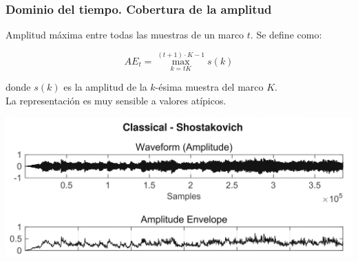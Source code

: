 \documentclass[
10pt, %
aspectratio=169, %
]{beamer}
\begin{document}
	\begin{frame}
		
		\frametitle{Dominio del tiempo. Cobertura de la amplitud}
		
		Amplitud máxima entre todas las muestras de un marco $t$. Se define como:
		
		$${AE}_t = \max_{k=tK}^{(t+1) \cdot K-1} s(k)$$
		
		donde $s(k)$ es la amplitud de la $k$-ésima muestra del marco $K$. \\[2mm]
		
		La representación es muy sensible a valores atípicos.
		
		\vspace{1\baselineskip}
		\centering
		\includegraphics[scale=0.4]{ae.png}
		
	\end{frame}
	
		
		
		
		
		
		
	
\end{document}
